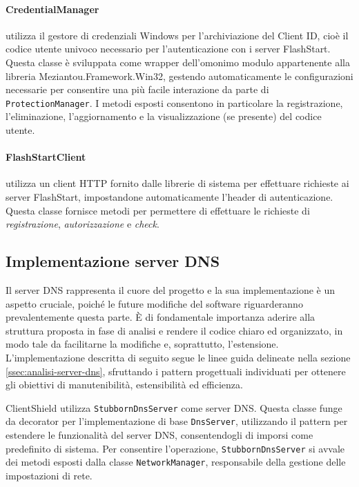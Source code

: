 \documentclass[12pt,a4paper,openright,twoside]{book}
\newcommand{\class}[1]{\texttt{#1}}
\begin{document}
\paragraph {CredentialManager} utilizza il gestore di credenziali Windows per l'archiviazione del Client ID, cioè il codice utente univoco necessario per l'autenticazione con i server FlashStart.
Questa classe è sviluppata come wrapper dell'omonimo modulo appartenente alla libreria Meziantou.Framework.Win32, gestendo automaticamente le configurazioni necessarie per consentire una più facile interazione da parte di \class{ProtectionManager}.
I metodi esposti consentono in particolare la registrazione, l'eliminazione, l'aggiornamento e la visualizzazione (se presente) del codice utente.\\

\paragraph{FlashStartClient} utilizza un client HTTP fornito dalle librerie di sistema per effettuare richieste ai server FlashStart, impostandone automaticamente l'header di autenticazione.
Questa classe fornisce metodi per permettere di effettuare le richieste di \textit{registrazione}, \textit{autorizzazione} e \textit{check}.

\subsection{Implementazione server DNS}

Il server \gls{DNS} rappresenta il cuore del progetto e la sua implementazione è un aspetto cruciale, poiché le future modifiche del software riguarderanno prevalentemente questa parte.  
È di fondamentale importanza aderire alla struttura proposta in fase di analisi e rendere il codice chiaro ed organizzato, in modo tale da facilitarne la modifiche e, soprattutto, l'estensione.
L'implementazione descritta di seguito segue le linee guida delineate nella sezione \ref{ssec:analisi-server-dns}, sfruttando i pattern progettuali individuati per ottenere gli obiettivi di manutenibilità, estensibilità ed efficienza.

ClientShield utilizza \class{StubbornDnsServer} come server \gls{DNS}.
Questa classe funge da decorator per l'implementazione di base \class{DnsServer}, utilizzando il pattern per estendere le funzionalità del server \gls{DNS}, consentendogli di imporsi come predefinito di sistema.
Per consentire l'operazione, \class{StubbornDnsServer} si avvale dei metodi esposti dalla classe \class{NetworkManager}, responsabile della gestione delle impostazioni di rete.  
\end{document}
